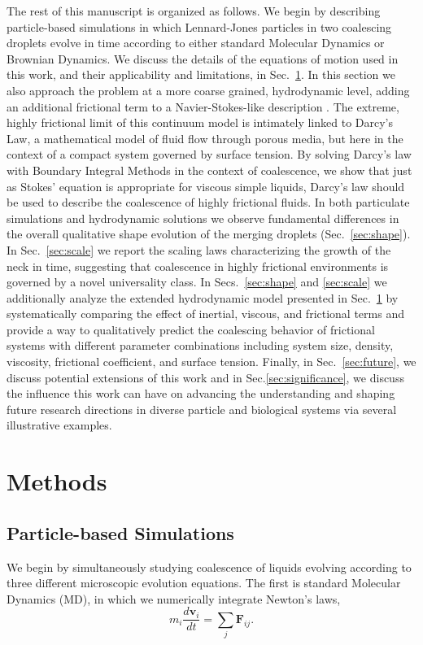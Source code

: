 \documentclass[%
reprint,
amsmath,amssymb,
aps,
]{revtex4-2}
\begin{document}
	
	The rest of this manuscript is organized as follows. We begin by describing particle-based simulations in which Lennard-Jones particles in two coalescing droplets evolve in time according to either standard Molecular Dynamics or Brownian Dynamics. We discuss the details of the equations of motion used in this work, and their applicability and limitations, in Sec.~\ref{sec:Methods}. In this section we also approach the problem at a more coarse grained, hydrodynamic level, adding an additional frictional term to a Navier-Stokes-like description \cite{orts2020dynamics}. The extreme, highly frictional limit of this continuum model is intimately linked to Darcy's Law, a mathematical model of fluid flow through porous media, but here in the context of a compact system governed by surface tension. By solving Darcy's law with Boundary Integral Methods in the context of coalescence, we show that just as Stokes' equation is appropriate for viscous simple liquids, Darcy's law should be used to describe the coalescence of highly frictional fluids. In both particulate simulations and hydrodynamic solutions we observe fundamental differences in the overall qualitative shape evolution of the merging droplets (Sec.~\ref{sec:shape}). In Sec.~\ref{sec:scale} we report the scaling laws characterizing the growth of the neck in time, suggesting that coalescence in highly frictional environments is governed by a novel universality class. In Secs.~\ref{sec:shape} and \ref{sec:scale} we additionally analyze the extended hydrodynamic model presented in Sec.~\ref{sec:Methods} by systematically comparing the effect of inertial, viscous, and frictional terms and provide a way to qualitatively predict the coalescing behavior of frictional systems with different parameter combinations including system size, density, viscosity, frictional coefficient, and surface tension. Finally, in Sec.~\ref{sec:future}, we discuss potential extensions of this work and in Sec.\ref{sec:significance}, we discuss the influence this work can have on advancing the understanding and shaping future research directions in diverse particle and biological systems via several illustrative examples.
	
	
	\section{Methods}
	\label{sec:Methods}
	\subsection{Particle-based Simulations}
	We begin by simultaneously studying coalescence of liquids evolving according to three different microscopic evolution equations. The first is  standard Molecular Dynamics (MD), in which we numerically integrate Newton's laws,
	\begin{equation}
		m_i\frac{d\textbf{v}_i}{dt} = \sum_j\textbf{F}_{ij}.
	\end{equation}
 
\end{document}

